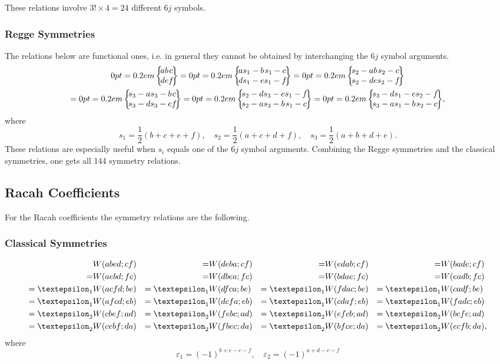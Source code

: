 These relations involve $3!\times 4=24$ different $6 j$ symbols.\\[0pt]
\subsubsection{Regge Symmetries \cite{ref095}}
The relations below are functional ones, i.e. in general they cannot be obtained by interchanging the $6 j$ symbol arguments.
\begin{gather}
\sixj{a}{b}{c}{d}{e}{f}
=\sixj{a}{s_{1}-b}{s_{1}-c}{d}{s_{1}-e}{s_{1}-f}
=\sixj{s_{2}-a}{b}{s_{2}-c}{s_{2}-d}{e}{s_{2}-f}  \notag\\
=\sixj{s_{3}-a}{s_{3}-b}{c}{s_{3}-d}{s_{3}-e}{f}
=\sixj{s_{2}-d}{s_{3}-e}{s_{1}-f}{s_{2}-a}{s_3-b}{s_1-c}
=\sixj{s_{3}-d}{s_{1}-e}{s_{2}-f}{s_{3}-a}{s_1-b}{s_2-c} , \label{eq:9:4:3}
\end{gather}
where
\begin{equation}
s_{1}=\frac{1}{2}(b+c+e+f), \quad s_{2}=\frac{1}{2}(a+c+d+f), \quad s_{3}=\frac{1}{2}(a+b+d+e) . \label{eq:9:4:4}
\end{equation}
These relations are especially useful when $s_{i}$ equals one of the $6 j$ symbol arguments. Combining the Regge symmetries and the classical symmetries, one gets all 144 symmetry relations.

\subsection{Racah Coefficients}\label{sec:9.4.3}
For the Racah coefficients the symmetry relations are the following.\\[0pt]
\subsubsection{Classical Symmetries \cite{ref091}}
\begin{alignat}{4}
& W(a b e d ; c f)&=&W(d e b a ; c f)&=&W(e d a b ; c f)&=&W(b a d e ; c f)  \notag\\
=&W(a e b d ; f c)&=&W(d b e a ; f c)&=&W(b d a e ; f c)&=&W(e a d b ; f c)  \notag\\
=\varepsilon_{1} &W(a c f d ; b e)&=\varepsilon_{1} &W(d f c a ; b e)&=\varepsilon_{1} &W(f d a c ; b e)&=\varepsilon_{1} &W(c a d f ; b e)  \notag\\
=\varepsilon_{1}& W(a f c d ; e b)&=\varepsilon_{1} &W(d c f a ; e b)&=\varepsilon_{1} &W(c d a f ; e b)&=\varepsilon_{1} &W(f a d c ; e b)  \label{eq:9:4:5}\\
=\varepsilon_{2}& W(c b e f ; a d)&=\varepsilon_{2} &W(f e b c ; a d)&=\varepsilon_{2} &W(e f c b ; a d)&=\varepsilon_{2} &W(b c f e ; a d)  \notag\\
=\varepsilon_{2}& W(c e b f ; d a)&=\varepsilon_{2} &W(f b e c ; d a)&=\varepsilon_{2} &W(b f c e ; d a)&=\varepsilon_{2} &W(e c f b ; d a), \notag
\end{alignat}
where
\begin{equation}
\varepsilon_{1}=(-1)^{b+e-c-f}, \quad \varepsilon_{2}=(-1)^{a+d-c-f} \label{eq:9:4:6}
\end{equation}
